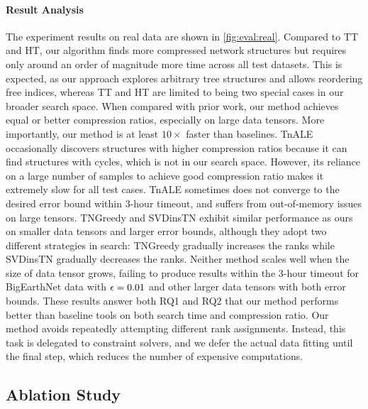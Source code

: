 \paragraph{Result Analysis}
%
The experiment results on real data are shown in \cref{fig:eval:real}.
%
Compared to TT and HT, our algorithm finds more compressed network structures but requires only around an order of magnitude more time across all test datasets.
%
This is expected, as our approach explores arbitrary tree structures and allows reordering free indices, whereas TT and HT are limited to being two special cases in our broader search space.
%
When compared with prior work, our method achieves equal or better compression ratios, especially on large data tensors.
%
More importantly, our method is at least $10\times$ faster than baselines.
%
TnALE occasionally discovers structures with higher compression ratios because it can find structures with cycles, which is not in our search space.
%
However, its reliance on a large number of samples to achieve good compression ratio makes it extremely slow for all test cases. 
%
TnALE sometimes does not converge to the desired error bound within 3-hour timeout, and suffers from out-of-memory issues on large tensors.
%
TNGreedy and SVDinsTN exhibit similar performance as ours on smaller data tensors and larger error bounds, although they adopt two different strategies in search: TNGreedy gradually increases the ranks while SVDinsTN gradually decreases the ranks.
%
Neither method scales well when the size of data tensor grows, failing to produce results within the 3-hour timeout for BigEarthNet data with $\epsilon = 0.01$ and other larger data tensors with both error bounds.
%
These results answer both RQ1 and RQ2 that our method performs better than baseline tools on both search time and compression ratio.
%
Our method avoids repeatedly attempting different rank assignments.
%
Instead, this task is delegated to constraint solvers, and we defer the actual data fitting until the final step, which reduces the number of expensive computations.

\subsection{Ablation Study}\label{sec:eval:ablation}
%


